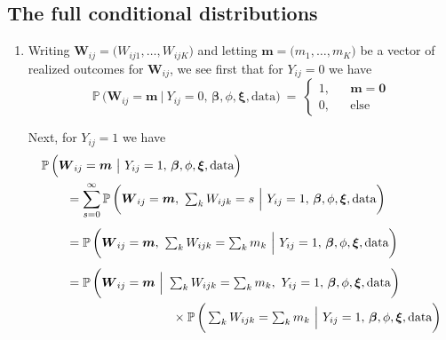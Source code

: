 \documentclass[11pt]{article}
\newcommand{\prob}{\mathbb{P}\,}
\renewcommand{\vec}{\boldsymbol}
\newcommand{\barM}{~\big|~}
\newcommand{\barB}{~\Big|~}
\begin{document}

\subsection{The full conditional distributions}

\begin{enumerate}[label=Step \arabic*., leftmargin=13mm, itemsep=10mm]
\item Writing $\vec{W}_{ij} = \big( W_{ij1},\dots,W_{ijK} \big)$ and letting $\vec{m} = \big(m_1,\dots,m_K\big)$ be a vector of realized outcomes for $\vec{W}_{ij}$, we see first that for $Y_{ij} = 0$ we have
\[ \prob\Big( \vec{W}_{ij} = \vec{m} \barM Y_{ij} = 0,\, \vec{\beta}, \phi, \vec{\xi}, \text{data} \Big) ~=~ \left\{ \begin{array}{lll} 1, & & \vec{m} = \vec{0} \\[1ex] 0, & & \text{else} \end{array} \right.  \]

Next, for $Y_{ij} = 1$ we have
\begin{align*} \MoveEqLeft
\prob\Big( \vec{W}_{ij} = \vec{m} \barM Y_{ij} = 1,\, \vec{\beta}, \phi, \vec{\xi}, \text{data} \Big) \\
&= \sum_{s=0}^\infty \prob\bigg( \vec{W}_{ij} = \vec{m},~ \textstyle \sum_{k} W_{ijk} = s \barB Y_{ij} = 1,\, \vec{\beta}, \phi, \vec{\xi}, \text{data} \bigg) \\[1ex]
&= \prob\bigg( \vec{W}_{ij} = \vec{m},~ \textstyle \sum_{k} W_{ijk} = \sum_k m_k  \barB Y_{ij} = 1,\, \vec{\beta}, \phi, \vec{\xi}, \text{data} \bigg) \\[1ex]
&= \prob\bigg( \vec{W}_{ij} = \vec{m} \barB \textstyle \sum_{k} W_{ijk} = \sum_k m_k,~  Y_{ij} = 1,\, \vec{\beta}, \phi, \vec{\xi}, \text{data} \bigg) \\
& \hspace{30mm} \times \prob\bigg( \textstyle \sum_{k} W_{ijk} = \sum_k m_k \barB  Y_{ij} = 1,\, \vec{\beta}, \phi, \vec{\xi}, \text{data} \bigg)
\end{align*}



\end{enumerate}
\end{document}
